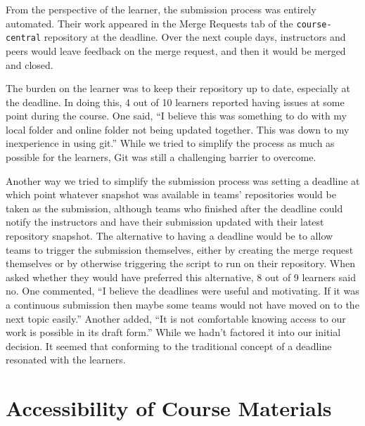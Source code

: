 \documentclass[12pt,twoside]{mitthesis}
\newcommand{\review}[1]{{\color{mygreen} #1}}
\begin{document}
\review{From the perspective of the learner, the submission process was entirely automated. Their work appeared in the Merge Requests tab of the \texttt{course-central} repository at the deadline. Over the next couple days, instructors and peers would leave feedback on the merge request, and then it would be merged and closed.

The burden on the learner was to keep their repository up to date, especially at the deadline. In doing this, 4 out of 10 learners reported having issues at some point during the course. One said, ``I believe this was something to do with my local folder and online folder not being updated together. This was down to my inexperience in using git.'' While we tried to simplify the process as much as possible for the learners, Git was still a challenging barrier to overcome.

Another way we tried to simplify the submission process was setting a deadline at which point whatever snapshot was available in teams' repositories would be taken as the submission, although teams who finished after the deadline could notify the instructors and have their submission updated with their latest repository snapshot. The alternative to having a deadline would be to allow teams to trigger the submission themselves, either by creating the merge request themselves or by otherwise triggering the script to run on their repository. When asked whether they would have preferred this alternative, 8 out of 9 learners said no. One commented, ``I believe the deadlines were useful and motivating. If it was a continuous submission then maybe some teams would not have moved on to the next topic easily.'' Another added, ``It is not comfortable knowing access to our work is possible in its draft form.'' While we hadn't factored it into our initial decision. It seemed that conforming to the traditional concept of a deadline resonated with the learners.}

\section{Accessibility of Course Materials}
\end{document}
